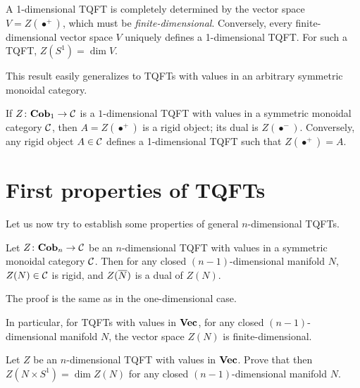 \begin{theorem}\label{t:1d-tqft2}
  A 1-dimensional TQFT is completely determined by the vector space
  $V=Z(\bullet^+)$, which must be \emph{finite-dimensional}. Conversely, every
  finite-dimensional vector space $V$ uniquely defines a 1-dimensional TQFT. For
  such a TQFT, $Z(S^1)=\dim V$.
\end{theorem}

This result easily generalizes to TQFTs with values in an arbitrary
symmetric monoidal category.
\begin{theorem}\label{t:1d-tqft}
  If $Z\colon \mathbf{Cob}_1\to \mathcal{C}$ is a $1$-dimensional TQFT with values in a
  symmetric monoidal category $\mathcal{C}$, then $A=Z(\bullet^+)$ is a rigid object;
  its dual is $Z(\bullet^-)$. Conversely, any rigid object $A\in \mathcal{C}$ defines
  a 1-dimensional TQFT such that $Z(\bullet^+)=A$.
\end{theorem}



\section{First properties of TQFTs}\label{s:first-properties}



Let us now try to establish some properties of general $n$-dimensional TQFTs.

\begin{theorem}\label{t:tqft-rigidity}
  Let $Z\colon \mathbf{Cob}_n\to \mathcal{C}$ be an $n$-dimensional TQFT with values in a
  symmetric monoidal category $\mathcal{C}$. Then for any closed $(n-1)$-dimensional
  manifold $N$, $Z(N)\in \mathcal{C}$ is rigid, and $Z(\overline{N})$ is a dual of $Z(N)$.
\end{theorem}
The proof is the same as in the one-dimensional case.

In particular, for TQFTs with values in $\mathbf{Vec}$, for any closed
$(n-1)$-dimensional manifold $N$, the vector space $Z(N)$ is finite-dimensional.

\begin{exercise}\label{ec:tqft-duality}
  Let $Z$ be an $n$-dimensional TQFT with values in $\mathbf{Vec}$.
  Prove that then
  $Z(N\times S^1)=\dim Z(N)$ for any closed $(n-1)$-dimensional manifold $N$.
\end{exercise}

